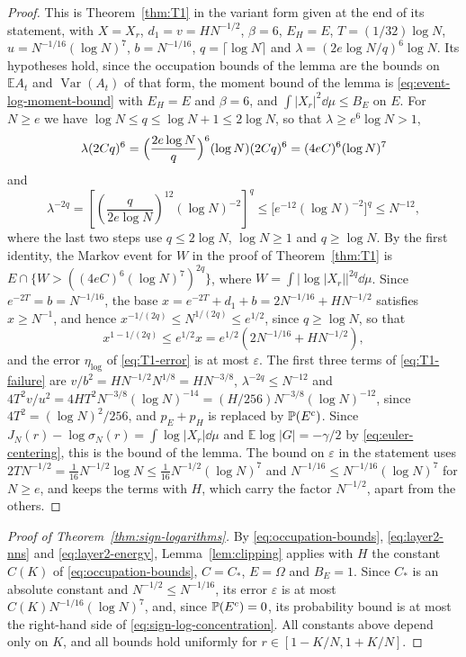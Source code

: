 \begin{proof}
This is Theorem~\ref{thm:T1} in the variant form given at the end of its
statement, with $X=X_r$,
$d_1=v=HN^{-1/2}$, $\beta=6$, $E_H=E$, $T=(1/32)\log N$,
$u=N^{-1/16}(\log N)^7$, $b=N^{-1/16}$, $q=\lceil\log N\rceil$ and
$\lambda=(2e\log N/q)^6\log N$. Its hypotheses hold, since the
occupation bounds of the lemma are the bounds on $\mathbb EA_t$ and
$\operatorname{Var}(A_t)$ of that form, the moment bound of the lemma
is \eqref{eq:event-log-moment-bound} with $E_H=E$ and $\beta=6$, and
$\int|X_r|^2\dd\mu\le B_E$ on $E$.
For $N\ge e$ we have $\log N\le q\le\log N+1\le2\log N$, so that
$\lambda\ge e^6\log N>1$,
\[
 \lambda(2Cq)^6
 =\Bigl(\frac{2e\log N}q\Bigr)^6(\log N)(2Cq)^6
 =(4eC)^6(\log N)^7
\]
and
\[
 \lambda^{-2q}
 =\left[\left(\frac q{2e\log N}\right)^{12}(\log N)^{-2}\right]^q
 \le\bigl[e^{-12}(\log N)^{-2}\bigr]^q
 \le N^{-12},
\]
where the last two steps use $q\le2\log N$, $\log N\ge1$ and
$q\ge\log N$. By the first identity, the Markov event for $W$ in the
proof of Theorem~\ref{thm:T1} is
$E\cap\{W>((4eC)^6(\log N)^7)^{2q}\}$, where
$W=\int|\log|X_r||^{2q}\dd\mu$.
Since $e^{-2T}=b=N^{-1/16}$, the base
$x=e^{-2T}+d_1+b=2N^{-1/16}+HN^{-1/2}$ satisfies $x\ge N^{-1}$, and
hence $x^{-1/(2q)}\le N^{1/(2q)}\le e^{1/2}$, since $q\ge\log N$, so that
\[
 x^{1-1/(2q)}\le e^{1/2}x=e^{1/2}(2N^{-1/16}+HN^{-1/2}),
\]
and the error $\eta_{\log}$ of \eqref{eq:T1-error} is at most
$\varepsilon$. The first three terms of \eqref{eq:T1-failure} are
$v/b^2=HN^{-1/2}N^{1/8}=HN^{-3/8}$, $\lambda^{-2q}\le N^{-12}$ and
$4T^2v/u^2=4HT^2N^{-3/8}(\log N)^{-14}=(H/256)N^{-3/8}(\log N)^{-12}$,
since $4T^2=(\log N)^2/256$, and $p_E+p_H$ is replaced by
$\mathbb P(E^c)$.
Since $J_N(r)-\log\sigma_N(r)=\int\log|X_r|\dd\mu$ and
$\mathbb E\log|G|=-\gamma/2$ by \eqref{eq:euler-centering}, this is the
bound of the lemma. The bound on $\varepsilon$ in the statement uses
$2TN^{-1/2}=\frac1{16}N^{-1/2}\log N\le\frac1{16}N^{-1/2}(\log N)^7$ and
$N^{-1/16}\le N^{-1/16}(\log N)^7$ for $N\ge e$, and keeps the terms with
$H$, which carry the factor $N^{-1/2}$, apart from the others.
\end{proof}

\begin{proof}[Proof of Theorem~\ref{thm:sign-logarithms}]
By \eqref{eq:occupation-bounds}, \eqref{eq:layer2-nns} and
\eqref{eq:layer2-energy}, Lemma~\ref{lem:clipping} applies with $H$ the
constant $C(K)$ of \eqref{eq:occupation-bounds}, $C=C_*$, $E=\Omega$ and
$B_E=1$.
Since $C_*$ is an absolute constant and $N^{-1/2}\le N^{-1/16}$, its
error $\varepsilon$ is at most $C(K)N^{-1/16}(\log N)^7$, and, since
$\mathbb P(E^c)=0$, its probability
bound is at most the right-hand side of
\eqref{eq:sign-log-concentration}.
All constants above depend only on $K$, and all bounds hold uniformly
for $r\in[1-K/N,1+K/N]$.
\end{proof}

